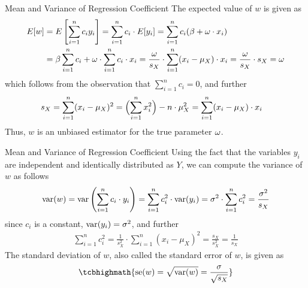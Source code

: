 \begin{frame}{Mean and Variance of Regression Coefficient}
The expected value of $w$ is given as
\begin{align*}
E[w] & = E\left[ \sum^{n}_{i=1} c_i y_i \right] = \sum^{n}_{i=1} c_i \cdot
    E[y_i] = \sum^{n}_{i=1} c_i (\beta+\omega\cdot x_i) \\
    & = \beta \sum^{n}_{i=1} c_i + \omega \cdot \sum^{n}_{i=1} c_i \cdot x_i
    = \frac{\omega}{s_X} \cdot \sum^{n}_{i=1} (x_i - \mu_X) \cdot x_i
    = \frac{\omega}{s_X} \cdot s_X = \omega
\end{align*}
which follows from the observation that $ \sum^{n}_{i=1} c_i = 0$, and
further
\begin{align*}
s_X & = \sum^{n}_{i=1} (x_i - \mu_X)^2  
= \Bigl(\sum_{i=1}^n x_i^2\Bigr) - n \cdot \mu_X^2
      = \sum^{n}_{i=1} (x_i - \mu_X) \cdot x_i
\end{align*}
Thus, $w$ is an unbiased estimator for the true parameter $\omega$.
\end{frame}

%
\begin{frame}{Mean and Variance of Regression Coefficient}
Using the fact that the variables $y_i$ are independent and identically
distributed as $Y$,
we can compute the variance of $w$ as follows
\begin{align}
    \operatorname{var}(w) = \operatorname{var}\left( \sum^{n}_{i=1} c_i \cdot y_i\right) = \sum^{n}_{i=1}
    c_i^2 \cdot \operatorname{var}(y_i) = 
    \sigma^2 \cdot \sum^{n}_{i=1} c_i^2 = 
    \frac{\sigma^2}{s_X}
    \label{eq:reg:eval:var_hw}
\end{align}
since $c_i$ is a constant, $\operatorname{var}(y_i) = \sigma^2$, and further
\begin{align*}
\sum_{i=1}^n c_i^2 = \frac{1}{ s_X^2}  \cdot \sum^{n}_{i=1}  (x_i - \mu_X)^2
    = \frac{s_X}{s_X^2} = \frac{1}{s_X}
\end{align*}
The standard deviation of $w$, also called the standard error of
$w$, is given as
\begin{align}
    \tcbhighmath{
    \se(w) = \sqrt{\var(w)} = \frac{\sigma}{\sqrt{s_X}}}
\end{align}
\end{frame}

